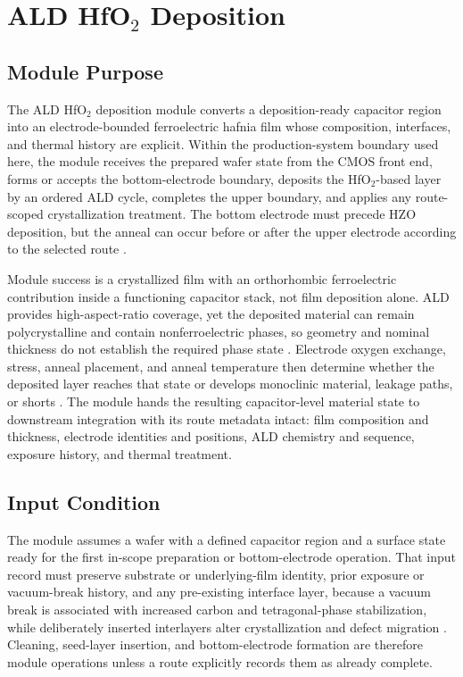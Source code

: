\documentclass[11pt,a4paper]{report}
\begin{document}

\setcounter{chapter}{2}
\chapter{ALD HfO$_2$ Deposition}
\label{chap:ald}

\section{Module Purpose}
\label{sec:ald-module-purpose}

The ALD HfO$_2$ deposition module converts a deposition-ready capacitor region into an electrode-bounded ferroelectric hafnia film whose composition, interfaces, and thermal history are explicit. Within the production-system boundary used here, the module receives the prepared wafer state from the CMOS front end, forms or accepts the bottom-electrode boundary, deposits the HfO$_2$-based layer by an ordered ALD cycle, completes the upper boundary, and applies any route-scoped crystallization treatment. The bottom electrode must precede HZO deposition, but the anneal can occur before or after the upper electrode according to the selected route \cite{kim2020tin,kaatranen2026unif,kashir2021wake,liu2025zrrich}.

Module success is a crystallized film with an orthorhombic ferroelectric contribution inside a functioning capacitor stack, not film deposition alone. ALD provides high-aspect-ratio coverage, yet the deposited material can remain polycrystalline and contain nonferroelectric phases, so geometry and nominal thickness do not establish the required phase state \cite{song2021ferro}. Electrode oxygen exchange, stress, anneal placement, and anneal temperature then determine whether the deposited layer reaches that state or develops monoclinic material, leakage paths, or shorts \cite{silva2023road,kim2020tin,song2023seed,kashir2021wake}. The module hands the resulting capacitor-level material state to downstream integration with its route metadata intact: film composition and thickness, electrode identities and positions, ALD chemistry and sequence, exposure history, and thermal treatment.

\section{Input Condition}
\label{sec:ald-input-condition}

The module assumes a wafer with a defined capacitor region and a surface state ready for the first in-scope preparation or bottom-electrode operation. That input record must preserve substrate or underlying-film identity, prior exposure or vacuum-break history, and any pre-existing interface layer, because a vacuum break is associated with increased carbon and tetragonal-phase stabilization, while deliberately inserted interlayers alter crystallization and defect migration \cite{silva2023road}. Cleaning, seed-layer insertion, and bottom-electrode formation are therefore module operations unless a route explicitly records them as already complete.
\end{document}
